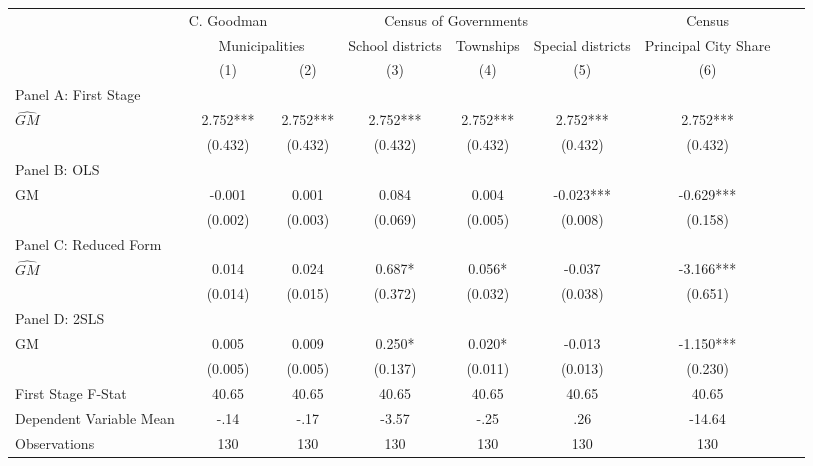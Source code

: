  \begin{tabular}{l*{8}{c}} \toprule
&\multicolumn{1}{c}{C. Goodman}&\multicolumn{4}{c}{Census of Governments}&\multicolumn{1}{c}{Census}\\\cmidrule(lr){2-2}\cmidrule(lr){3-6}\cmidrule(lr){7-7}
&\multicolumn{2}{c}{Municipalities}&\multicolumn{1}{c}{School districts}&\multicolumn{1}{c}{Townships}&\multicolumn{1}{c}{Special districts}&\multicolumn{1}{c}{Principal City Share}\\\cmidrule(lr){2-3}\cmidrule(lr){4-6}\cmidrule(lr){7-7}
&\multicolumn{1}{c}{(1)}&\multicolumn{1}{c}{(2)}&\multicolumn{1}{c}{(3)}&\multicolumn{1}{c}{(4)}&\multicolumn{1}{c}{(5)}&\multicolumn{1}{c}{(6)}\\
\cmidrule(lr){1-7}
\multicolumn{6}{l}{Panel A: First Stage}\\
\cmidrule(lr){1-7}
$\widehat{GM}$  &    2.752***&    2.752***&    2.752***&    2.752***&    2.752***&    2.752***\\
                &  (0.432)   &  (0.432)   &  (0.432)   &  (0.432)   &  (0.432)   &  (0.432)   \\
\cmidrule(lr){1-7}
\multicolumn{6}{l}{Panel B: OLS}\\
\cmidrule(lr){1-7}
GM              &   -0.001   &    0.001   &    0.084   &    0.004   &   -0.023***&   -0.629***\\
                &  (0.002)   &  (0.003)   &  (0.069)   &  (0.005)   &  (0.008)   &  (0.158)   \\
\cmidrule(lr){1-7}
\multicolumn{6}{l}{Panel C: Reduced Form}\\
\cmidrule(lr){1-7}
$\widehat{GM}$  &    0.014   &    0.024   &    0.687*  &    0.056*  &   -0.037   &   -3.166***\\
                &  (0.014)   &  (0.015)   &  (0.372)   &  (0.032)   &  (0.038)   &  (0.651)   \\
\cmidrule(lr){1-7}
\multicolumn{6}{l}{Panel D: 2SLS}\\
\cmidrule(lr){1-7}
GM              &    0.005   &    0.009   &    0.250*  &    0.020*  &   -0.013   &   -1.150***\\
                &  (0.005)   &  (0.005)   &  (0.137)   &  (0.011)   &  (0.013)   &  (0.230)   \\
\midrule
First Stage F-Stat&    40.65   &    40.65   &    40.65   &    40.65   &    40.65   &    40.65   \\
Dependent Variable Mean&     -.14   &     -.17   &    -3.57   &     -.25   &      .26   &   -14.64   \\
Observations    &      130   &      130   &      130   &      130   &      130   &      130   \\
       \bottomrule \end{tabular}
